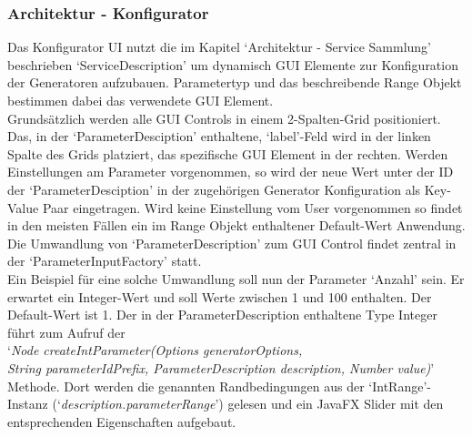 \documentclass[../mciAusarbeitung.tex]{subfiles}
\begin{document}
	\subsubsection{Architektur - Konfigurator}
Das Konfigurator UI nutzt die im Kapitel `Architektur - Service Sammlung' beschrieben `ServiceDescription' um dynamisch GUI Elemente zur Konfiguration der Generatoren aufzubauen. Parametertyp und das beschreibende Range Objekt bestimmen dabei das verwendete GUI Element. \\
Grundsätzlich werden alle GUI Controls in einem 2-Spalten-Grid positioniert. Das, in der `ParameterDesciption' enthaltene, `label'-Feld wird in der linken Spalte des Grids platziert, das spezifische GUI Element in der rechten. Werden Einstellungen am Parameter vorgenommen, so wird der neue Wert unter der ID der `ParameterDesciption' in der zugehörigen Generator Konfiguration als Key-Value Paar eingetragen. Wird keine Einstellung vom User vorgenommen so findet in den meisten Fällen ein im Range Objekt enthaltener Default-Wert Anwendung.\\
Die Umwandlung von `ParameterDescription' zum GUI Control findet zentral in der `ParameterInputFactory'  statt.\\
Ein Beispiel für eine solche Umwandlung soll nun der Parameter `Anzahl' sein. Er erwartet ein Integer-Wert und soll Werte zwischen 1 und 100 enthalten. Der Default-Wert ist 1. Der in der ParameterDescription enthaltene Type Integer führt zum Aufruf der \\
`\textit{Node createIntParameter(Options generatorOptions,\\
\indent String parameterIdPrefix, ParameterDescription description, Number value)}' Methode. Dort werden die genannten Randbedingungen aus der `IntRange'-Instanz (`\textit{description.parameterRange}') gelesen und ein JavaFX Slider mit den entsprechenden Eigenschaften aufgebaut.
	

%
%
\end{document}
